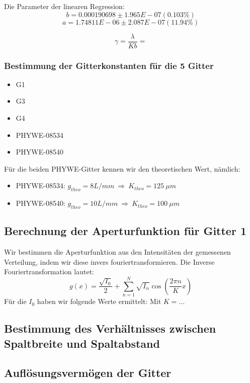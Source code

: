 Die Parameter der linearen Regression:
$$ b               = 0.000190698      \pm 1.965E-07    (0.103\%) $$
$$ a               = 1.74811E-06      \pm 2.087E-07    (11.94\%) $$

$$ \gamma = \frac{\lambda}{Kb} = $$


\subsubsection{Bestimmung der Gitterkonstanten f\"ur die 5 Gitter}
\begin{itemize}
\item G1
\item G3
\item G4
\item PHYWE-08534
\item PHYWE-08540
\end{itemize}

F\"ur die beiden PHYWE-Gitter kennen wir den theoretischen Wert, n\"amlich: 
\begin{itemize}
\item PHYWE-08534: $g_{theo} = 8 L/mm\ \Rightarrow \ K_{theo} = 125 \ \mu m$
\item PHYWE-08540: $g_{theo} = 10 L/mm\ \Rightarrow \ K_{theo} = 100 \ \mu m$
\end{itemize} 

\subsection{Berechnung der Aperturfunktion f\"ur Gitter 1}

Wir bestimmen die Aperturfunktion aus den Intensit\"aten der gemessenen Verteilung, indem wir diese invers fouriertransformieren. Die Inverse Fouriertransformation lautet:
$$g(x) = \frac{\sqrt{I_0}}{2} + \sum_{n=1}^N \sqrt{I_n}\cos\left(\frac{2\pi n}{K}x \right)$$
F\"ur die $I_0$ haben wir folgende Werte ermittelt:
Mit $K = ... $ %

\subsection{Bestimmung des Verh\"altnisses zwischen Spaltbreite und Spaltabstand}

\subsection{Aufl\"osungsverm\"ogen der Gitter}

